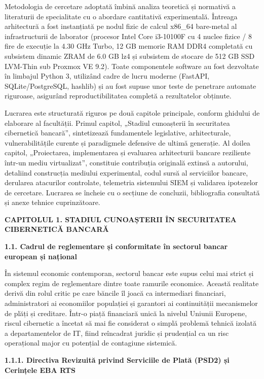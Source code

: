 \documentclass[
]{article}
\begin{document}
Metodologia de cercetare adoptată îmbină analiza teoretică și normativă
a literaturii de specialitate cu o abordare cantitativă experimentală.
Întreaga arhitectură a fost instanțiată pe nodul fizic de calcul x86\_64
bare-metal al infrastructurii de laborator (procesor Intel Core
i3-10100F cu 4 nuclee fizice / 8 fire de execuție la 4.30 GHz Turbo, 12
GB memorie RAM DDR4 completată cu subsistem dinamic ZRAM de 6.0 GB lz4
și subsistem de stocare de 512 GB SSD LVM-Thin sub Proxmox VE 9.2).
Toate componentele software au fost dezvoltate în limbajul Python 3,
utilizând cadre de lucru moderne (FastAPI, SQLite/PostgreSQL, hashlib)
și au fost supuse unor teste de penetrare automate riguroase, asigurând
reproductibilitatea completă a rezultatelor obținute.

Lucrarea este structurată riguros pe două capitole principale, conform
ghidului de elaborare al facultății. Primul capitol, „Stadiul
cunoașterii în securitatea cibernetică bancară'', sintetizează
fundamentele legislative, arhitecturale, vulnerabilitățile curente și
paradigmele defensive de ultimă generație. Al doilea capitol,
„Proiectarea, implementarea și evaluarea arhitecturii bancare reziliente
într-un mediu virtualizat'', constituie contribuția originală extinsă a
autorului, detaliind construcția mediului experimental, codul sursă al
serviciilor bancare, derularea atacurilor controlate, telemetria
sistemului SIEM și validarea ipotezelor de cercetare. Lucrarea se
încheie cu o secțiune de concluzii, bibliografia consultată și anexe
tehnice cuprinzătoare.

\textbf{CAPITOLUL 1. STADIUL CUNOAȘTERII ÎN SECURITATEA CIBERNETICĂ
BANCARĂ}

\textbf{1.1. Cadrul de reglementare și conformitate în sectorul bancar
european și național}

În sistemul economic contemporan, sectorul bancar este supus celui mai
strict și complex regim de reglementare dintre toate ramurile economice.
Această realitate derivă din rolul critic pe care băncile îl joacă ca
intermediari financiari, administratori ai economiilor populației și
garantori ai continuității mecanismelor de plăți și creditare. Într-o
piață financiară unică la nivelul Uniunii Europene, riscul cibernetic a
încetat să mai fie considerat o simplă problemă tehnică izolată a
departamentelor de IT, fiind reîncadrat juridic și prudențial ca un risc
operațional major cu potențial de contagiune sistemică.

\textbf{1.1.1. Directiva Revizuită privind Serviciile de Plată (PSD2) și
Cerințele EBA RTS}
\end{document}
